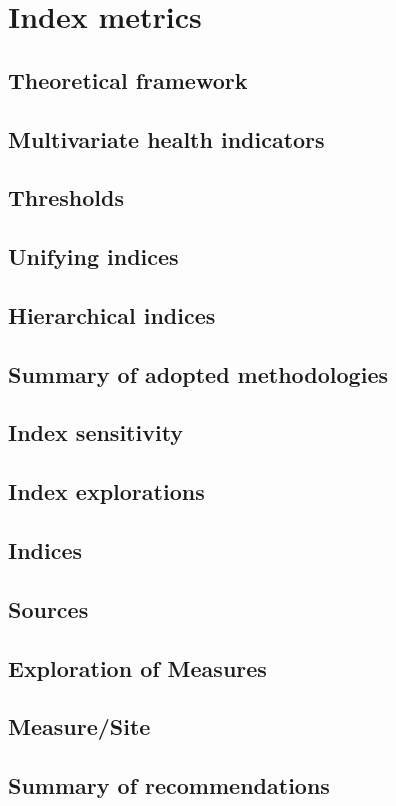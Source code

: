 \documentclass[a4paper]{AIMSreport}
\begin{document}
\section{Index metrics}

\subsection{Theoretical framework}
\subsection{Multivariate health indicators}
\subsection{Thresholds}
\subsection{Unifying indices}
\subsection{Hierarchical indices}
\subsection{Summary of adopted methodologies}
\subsection{Index sensitivity}
\subsection{Index explorations}
\subsection{Indices}

\subsection{Sources}
\subsection{Exploration of Measures}
\subsection{Measure/Site}
\subsection{Summary of recommendations}
\end{document}
